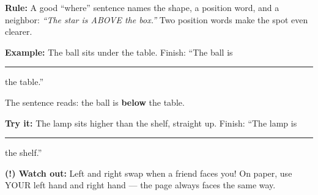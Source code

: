 \documentclass[12pt]{article}
\begin{document}

\begin{formulabox}
\textbf{Rule:} A good ``where'' sentence names the shape, a position word,
and a neighbor: \emph{``The star is ABOVE the box.''} Two position words
make the spot even clearer.
\end{formulabox}

\begin{examplebox}
\textbf{Example:} \quad The ball sits under the table. Finish: ``The ball is
\rule{1.2cm}{0.4pt} the table.''

The sentence reads: the ball is \textbf{below} the table.
\end{examplebox}

\begin{tryitbox}
\textbf{Try it:} \quad The lamp sits higher than the shelf, straight up.
Finish: ``The lamp is \rule{1.2cm}{0.4pt} the shelf.''\\[2pt]
\end{tryitbox}

\begin{watchoutbox}
\textbf{(!) Watch out:} Left and right swap when a friend faces you! On
paper, use YOUR left hand and right hand --- the page always faces the same
way.
\end{watchoutbox}
\end{document}
